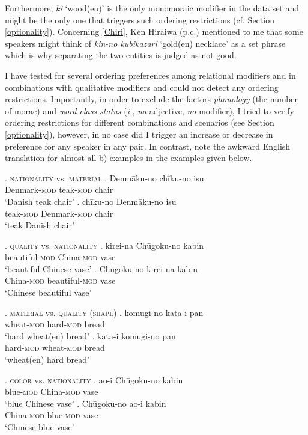 Furthermore, \textit{ki} `wood(en)’ is the only monomoraic modifier in the data set and might be the only one that triggers such ordering restrictions (cf. Section \ref{optionality}). Concerning \ref{Chiri}, Ken Hiraiwa (p.c.) mentioned to me that some speakers might think of \textit{kin-no kubikazari} `gold(en) necklace' as a set phrase which is why separating the two entities is judged as not good.

I have tested for several ordering preferences among relational modifiers and in combinations with qualitative modifiers and could not detect any ordering restrictions. Importantly, in order to exclude the factors \textit{phonology} (the number of morae) and \textit{word class status} (\textit{i}-, \textit{na}-adjective, \textit{no}-modifier), I tried to verify ordering restrictions for different combinations and scenarios (see Section \ref{optionality}), however, in no case did I trigger an increase or decrease in preference for any speaker in any pair. In contrast, note the awkward English translation for almost all b) examples in the examples given below.

\ex. \textsc{nationality} vs. \textsc{material}
\ag. Denmāku-no chīku-no isu\\
Denmark-\textsc{mod} teak-\textsc{mod} chair\\
`Danish teak chair'
\bg. chīku-no Denmāku-no isu\\
teak-\textsc{mod} Denmark-\textsc{mod} chair\\
`teak Danish chair'

\newpage
\ex. \textsc{quality} vs. \textsc{nationality}
\ag. kirei-na Chūgoku-no kabin\\
beautiful-\textsc{mod} China-\textsc{mod} vase\\
`beautiful Chinese vase'
\bg. Chūgoku-no kirei-na kabin\\
China-\textsc{mod} beautiful-\textsc{mod} vase\\
`Chinese beautiful vase'

\ex. \textsc{material} vs. \textsc{quality} (\textsc{shape})
\ag. komugi-no kata-i pan\\
wheat-\textsc{mod} hard-\textsc{mod} bread\\
`hard wheat(en) bread'
\bg. kata-i komugi-no pan\\
hard-\textsc{mod} wheat-\textsc{mod} bread\\
`wheat(en) hard bread'

\ex. \textsc{color} vs. \textsc{nationality}
\ag. ao-i Chūgoku-no kabin\\
blue-\textsc{mod} China-\textsc{mod} vase\\
`blue Chinese vase'
\bg. Chūgoku-no ao-i kabin\\
China-\textsc{mod} blue-\textsc{mod} vase\\
`Chinese blue vase'

